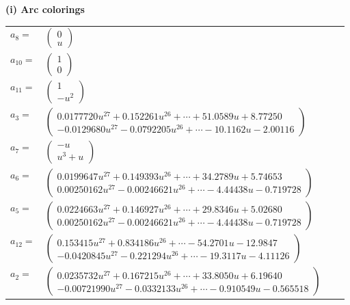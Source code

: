 \documentclass[1p]{elsarticle_modified}
\theoremstyle{definition}
\begin{document}
\flushleft \textbf{(i) Arc colorings}\\
\begin{tabular}{m{7pt} m{180pt} m{7pt} m{180pt} }
\flushright $a_{8}=$&$\begin{pmatrix}0\\u\end{pmatrix}$ \\
\flushright $a_{10}=$&$\begin{pmatrix}1\\0\end{pmatrix}$ \\
\flushright $a_{11}=$&$\begin{pmatrix}1\\- u^2\end{pmatrix}$ \\
\flushright $a_{3}=$&$\begin{pmatrix}0.0177720 u^{27}+0.152261 u^{26}+\cdots+51.0589 u+8.77250\\-0.0129680 u^{27}-0.0792205 u^{26}+\cdots-10.1162 u-2.00116\end{pmatrix}$ \\
\flushright $a_{7}=$&$\begin{pmatrix}- u\\u^3+u\end{pmatrix}$ \\
\flushright $a_{6}=$&$\begin{pmatrix}0.0199647 u^{27}+0.149393 u^{26}+\cdots+34.2789 u+5.74653\\0.00250162 u^{27}-0.00246621 u^{26}+\cdots-4.44438 u-0.719728\end{pmatrix}$ \\
\flushright $a_{5}=$&$\begin{pmatrix}0.0224663 u^{27}+0.146927 u^{26}+\cdots+29.8346 u+5.02680\\0.00250162 u^{27}-0.00246621 u^{26}+\cdots-4.44438 u-0.719728\end{pmatrix}$ \\
\flushright $a_{12}=$&$\begin{pmatrix}0.153415 u^{27}+0.834186 u^{26}+\cdots-54.2701 u-12.9847\\-0.0420845 u^{27}-0.221294 u^{26}+\cdots-19.3117 u-4.11126\end{pmatrix}$ \\
\flushright $a_{2}=$&$\begin{pmatrix}0.0235732 u^{27}+0.167215 u^{26}+\cdots+33.8050 u+6.19640\\-0.00721990 u^{27}-0.0332133 u^{26}+\cdots-0.910549 u-0.565518\end{pmatrix}$ \\

\end{tabular}
\end{document}
